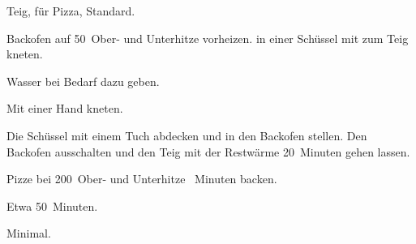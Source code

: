 \begin{recipe}{Teig, für Pizza, Standard.}
	\item[Vorbereitung] Backofen auf 50\textcelsius~Ober- und Unterhitze vorheizen.
	 in einer Schüssel mit
	 zum Teig kneten. 
	\item[Tipp] Wasser bei Bedarf dazu geben. 
	\item[Tipp] Mit einer Hand kneten.
	\item[Gehen lassen] Die Schüssel mit einem Tuch abdecken und in den Backofen stellen. Den Backofen ausschalten und den Teig mit der Restwärme 20~Minuten gehen lassen.
	\item[Pizza machen]
	\item[Backen] Pizze bei 200\textcelsius~Ober- und Unterhitze ~Minuten backen.
	\item[Zubereitungszeit] Etwa 50~Minuten.
	\item[Abwaschaufwand] Minimal.
\end{recipe}